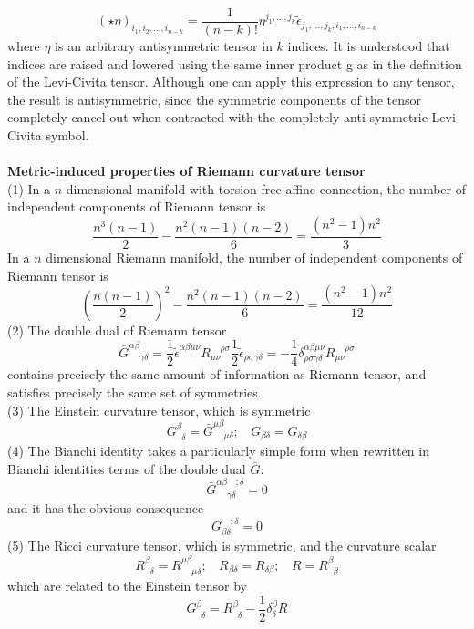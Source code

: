 \documentclass{article}
\begin{document}
\[(\star \eta )_{i_{1},i_{2},\ldots ,i_{n-k}}={\frac {1}{(n-k)!}}\eta ^{j_{1},\ldots ,j_{k}} \tilde{\epsilon} _{j_{1},\ldots ,j_{k},i_{1},\ldots ,i_{n-k}}\]
where $\eta$ is an arbitrary antisymmetric tensor in $k$ indices. It is understood that indices are raised and lowered using the same inner product g as in the definition of the Levi-Civita tensor. Although one can apply this expression to any tensor, the result is antisymmetric, since the symmetric components of the tensor completely cancel out when contracted with the completely anti-symmetric Levi-Civita symbol.\\ \\
\textbf{Metric-induced properties of Riemann curvature tensor}\\
(1) In a $n$ dimensional manifold with torsion-free affine connection, the number of independent components of Riemann tensor is \[\frac{n^3(n-1)}{2} - \frac{n^2(n-1)(n-2)}{6} = \frac{(n^2-1)n^2}{3}\]
In a $n$ dimensional Riemann manifold,  the number of independent components of Riemann tensor is \[(\frac{n(n-1)}{2})^2 -\frac{n^2(n-1)(n-2)}{6} = \frac{(n^2-1)n^2}{12} \]
(2) The double dual of Riemann tensor
\[\bar{G}^{\alpha \beta}_{\phantom{\alpha \beta} \gamma \delta} = \frac{1}{2} \tilde{\epsilon}^{\alpha \beta \mu \nu} R_{\mu \nu}^{\phantom{\mu \nu} \rho \sigma} \frac{1}{2} \tilde{\epsilon}_{\rho \sigma \gamma \delta} = -\frac{1}{4} \delta^{\alpha \beta \mu \nu}_{\rho \sigma \gamma \delta} R_{\mu \nu}^{\phantom{\mu \nu} \rho \sigma} \]
contains precisely the same amount of information as
Riemann tensor, and satisfies precisely the same set of symmetries.\\
(3) The Einstein curvature tensor, which is symmetric
\[G^{\beta}_{\phantom{\beta}\delta} = \bar{G}^{\mu \beta}_{\phantom{\mu \beta} \mu \delta}; \ \ \ \ G_{\beta \delta}=G_{\delta \beta}\]
(4) The Bianchi identity takes a particularly simple form when rewritten in Bianchi identities terms of the double dual $\bar{G}$:
\[\bar{G}^{\alpha \beta \phantom{\gamma \delta};\delta}_{\phantom{\alpha \beta} \gamma \delta} = 0\]
and it has the obvious consequence
\[G_{\beta \delta}^{\phantom{\beta \delta};\delta} = 0\]
(5) The Ricci curvature tensor, which is symmetric, and the curvature scalar
\[R^{\beta}_{\phantom{\beta}\delta} = R^{\mu \beta}_{\phantom{\mu \beta} \mu \delta}; \ \ \ \ R_{\beta \delta}=R_{\delta \beta}; \ \ \  \ R = R^{\beta}_{\phantom{\beta}\beta}\]
which are related to the Einstein tensor by 
\[G^{\beta}_{\phantom{\beta}\delta} =  R^{\beta}_{\phantom{\beta}\delta} - \frac{1}{2} \delta^{\beta}_{\delta}R\]
\end{document}
